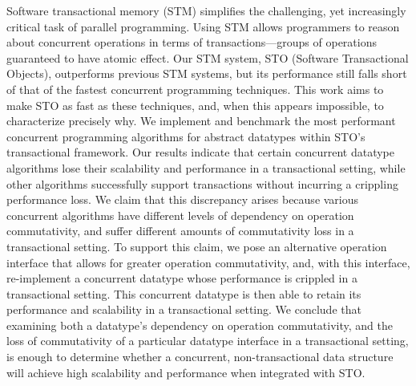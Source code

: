 Software transactional memory (STM) simplifies the challenging, yet increasingly critical task of parallel programming. Using STM allows programmers to reason about concurrent operations in terms of transactions---groups of operations guaranteed to have atomic effect. Our STM system, STO (Software Transactional Objects), outperforms previous STM systems, but its performance still falls short of that of the fastest concurrent programming techniques. This work aims to make STO as fast as these techniques, and, when this appears impossible, to characterize precisely why. 
We implement and benchmark the most performant concurrent programming algorithms for abstract datatypes within STO's transactional framework. Our results indicate that certain concurrent datatype algorithms lose their scalability and performance in a transactional setting, while other algorithms successfully support transactions without incurring a crippling performance loss. We claim that this discrepancy arises because various concurrent algorithms have different levels of dependency on operation commutativity, and suffer different amounts of commutativity loss in a transactional setting. To support this claim, we pose an alternative operation interface that allows for greater operation commutativity, and, with this interface, re-implement a concurrent datatype whose performance is crippled in a transactional setting. This concurrent datatype is then able to retain its performance and scalability in a transactional setting.
We conclude that examining both a datatype's dependency on operation commutativity, and the loss of commutativity of a particular datatype interface in a transactional setting, is enough to determine whether a concurrent, non-transactional data structure will achieve high scalability and performance when integrated with STO.
